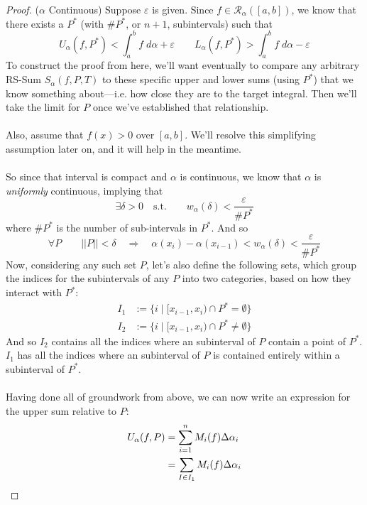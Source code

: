 \documentclass[12pt]{article}
\theoremstyle{plain}
\theoremstyle{definition}
\theoremstyle{remark}
\begin{document}
\begin{proof}($\alpha$ Continuous)
Suppose $\varepsilon$ is given. Since $f\in\mathscr{R}_\alpha([a,b])$, we know that there exists a $P^*$ (with $\#P^*$, or $n+1$, subintervals) such that 
\begin{equation}
    \label{bases}
    U_\alpha(f,P^*) < \int^b_a f\;d\alpha + \varepsilon
        \qquad L_\alpha(f,P^*) > \int^b_a f\;d\alpha - \varepsilon
\end{equation}
To construct the proof from here, we'll want eventually to compare any arbitrary RS-Sum $S_\alpha(f,P,T)$ to these specific upper and lower sums (using $P^*$) that we know something about---i.e. how close they are to the target integral. Then we'll take the limit for $P$ once we've established that relationship.
\\
\\
Also, assume that $f(x)>0$ over $[a,b]$. We'll resolve this simplifying assumption later on, and it will help in the meantime.
\\
\\
So since that interval is compact and $\alpha$ is continuous, we know that $\alpha$ is \emph{uniformly} continuous, implying that
    \[ \exists \delta > 0 \quad \text{s.t.} \qquad 
    w_\alpha(\delta) < \frac{\varepsilon}{\#P^*} \]
where $\#P^*$ is the number of sub-intervals in $P^*$. And so 
    \[ \forall P \qquad ||P||<\delta \quad \Rightarrow 
        \quad \alpha(x_i) - \alpha(x_{i-1}) < w_\alpha(\delta)
        <  \frac{\varepsilon}{\#P^*} \]
Now, considering any such set $P$, let's also define the following sets, which group the indices for the subintervals of any $P$ into two categories, based on how they interact with $P^*$:
\begin{align*}
    I_1 &:= \{i \; | \; [x_{i-1},x_i) \cap P^* = \emptyset \}\\
    I_2 &:= \{i \; | \; [x_{i-1},x_i) \cap P^* \neq \emptyset \}
\end{align*}
And so $I_2$ contains all the indices where an subinterval of $P$ contain a point of $P^*$. $I_1$ has all the indices where an subinterval of $P$ is contained entirely within a subinterval of $P^*$.
\\
\\
Having done all of groundwork from above, we can now write an expression for the upper sum relative to $P$:
\begin{align}
    U_\alpha(f,P) &= \sum^n_{i=1} M_i(f) \Delta\alpha_i \notag \\
        &= \sum_{I\in I_1} M_i(f) \Delta\alpha_i 

\end{align}
\end{proof}
\end{document}
